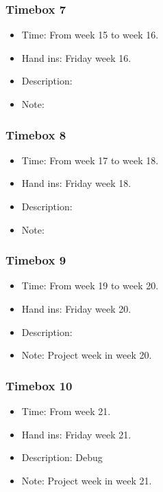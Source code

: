 \documentclass[10pt,a4paper]{article}
\begin{document}
\subsubsection{Timebox 7}
\begin{itemize}
\item Time: From week 15 to week 16.
\item Hand ins: Friday week 16.
\item Description:
\item Note:
\end{itemize}

\subsubsection{Timebox 8}
\begin{itemize}
\item Time: From week 17 to week 18.
\item Hand ins: Friday week 18.
\item Description:
\item Note:
\end{itemize}

\subsubsection{Timebox 9}
\begin{itemize}
\item Time: From week 19 to week 20.
\item Hand ins: Friday week 20.
\item Description:
\item Note: Project week in week 20.
\end{itemize}

\subsubsection{Timebox 10}
\begin{itemize}
\item Time: From week 21.
\item Hand ins: Friday week 21.
\item Description: Debug
\item Note: Project week in week 21.
\end{itemize}
\end{document}
